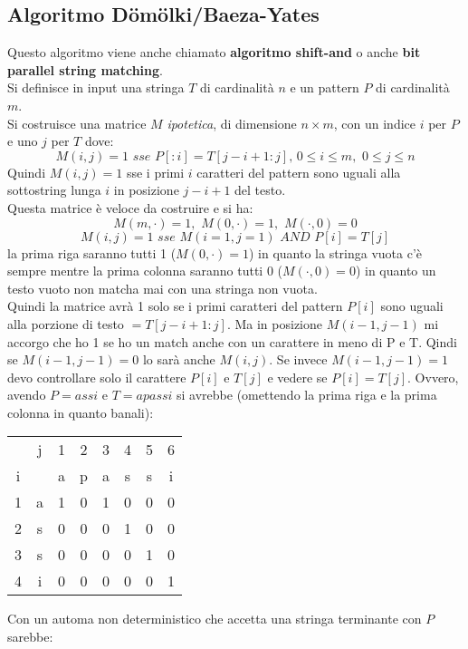 \documentclass[a4paper,12pt, oneside]{book}
\begin{document}
\subsection{Algoritmo D\"om\"olki/Baeza-Yates}
Questo algoritmo viene anche chiamato \textbf{algoritmo shift-and} o
  anche \textbf{bit parallel string matching}.\\
Si definisce in input una stringa $T$ di cardinalità $n$ e un pattern
$P$ di cardinalità $m$.\\
Si costruisce una matrice $M$ \textit{ipotetica}, di dimensione
$n\times m$, con un indice $i$ per $P$ e uno $j$ per $T$  dove:
\[M(i,j)=1\,\,sse\,\,P[:i]=T[j-i+1:j],\,0\leq i\leq m,\,\,0\leq j\leq
  n\]
Quindi $M(i,j)=1$ sse i primi $i$ caratteri del pattern sono uguali
alla sottostring lunga $i$ in posizione $j-i+1$ del testo.\\
Questa matrice è veloce da costruire e si ha:
\[M(m,\cdot) = 1,\,\, M(0,\cdot)=1,\,\, M(\cdot, 0)=0\]
\[M(i,j)=1\,\,sse\,\,M(i=1, j=1)\,\,AND\,\, P[i]=T[j]\]
la prima riga saranno tutti 1 ($ M(0,\cdot)=1$) in quanto la stringa
vuota c'è sempre mentre la prima colonna saranno tutti 0 ($M(\cdot,
0)=0$) in quanto un testo vuoto non matcha mai con una stringa non
vuota.\\
Quindi la matrice avrà 1 solo se i primi caratteri del pattern $P[i]$ sono
uguali alla porzione di testo $=T[j-i+1:j]$. Ma in posizione $M(i-1,
j-1)$ mi accorgo che ho 1 se ho un match anche con un carattere in
meno di P e T. Qindi se $M(i-1,j-1)=0$ lo sarà anche $M(i,j)$. Se
invece $M(i-1,j-1)=1$ devo controllare solo il carattere $P[i]$ e
$T[j]$ e vedere se $ P[i]=T[j]$.
Ovvero, avendo $P=assi$ e $T=apassi$ si avrebbe (omettendo la prima
riga e la prima colonna in quanto banali):
\begin{center}
  \begin{tabular}{c c | c c c c c c}
    & j & 1 & 2 & 3 & 4 & 5 & 6 \\
    i & & a & p & a & s & s & i \\
    \hline
    1 & a & 1 & 0 & 1 & 0 & 0 & 0\\
    2 & s & 0 & 0 & 0 & 1 & 0 & 0 \\
    3 & s & 0 & 0 & 0 & 0 & 1 & 0 \\
    4 & i & 0 & 0 & 0 & 0 & 0 & 1
  \end{tabular}
\end{center}
Con un automa non deterministico che accetta una stringa terminante
con $P$ sarebbe:
\begin{center}
\end{center}
\end{document}
